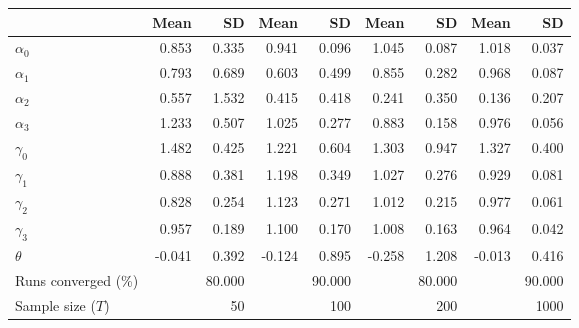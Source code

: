 
\begin{tabular}[t]{lrrrrrrrr}
\toprule
  & Mean & SD & Mean  & SD  & Mean   & SD   & Mean    & SD   \\
\midrule
$\alpha_{0}$ & 0.853 & 0.335 & 0.941 & 0.096 & 1.045 & 0.087 & 1.018 & 0.037\\
$\alpha_{1}$ & 0.793 & 0.689 & 0.603 & 0.499 & 0.855 & 0.282 & 0.968 & 0.087\\
$\alpha_{2}$ & 0.557 & 1.532 & 0.415 & 0.418 & 0.241 & 0.350 & 0.136 & 0.207\\
$\alpha_{3}$ & 1.233 & 0.507 & 1.025 & 0.277 & 0.883 & 0.158 & 0.976 & 0.056\\
$\gamma_{0}$ & 1.482 & 0.425 & 1.221 & 0.604 & 1.303 & 0.947 & 1.327 & 0.400\\
$\gamma_{1}$ & 0.888 & 0.381 & 1.198 & 0.349 & 1.027 & 0.276 & 0.929 & 0.081\\
$\gamma_{2}$ & 0.828 & 0.254 & 1.123 & 0.271 & 1.012 & 0.215 & 0.977 & 0.061\\
$\gamma_{3}$ & 0.957 & 0.189 & 1.100 & 0.170 & 1.008 & 0.163 & 0.964 & 0.042\\
$\theta$ & -0.041 & 0.392 & -0.124 & 0.895 & -0.258 & 1.208 & -0.013 & 0.416\\
Runs converged (\%) &  & 80.000 &  & 90.000 &  & 80.000 &  & 90.000\\
Sample size ($T$) &  & 50 &  & 100 &  & 200 &  & 1000\\
\bottomrule
\end{tabular}
